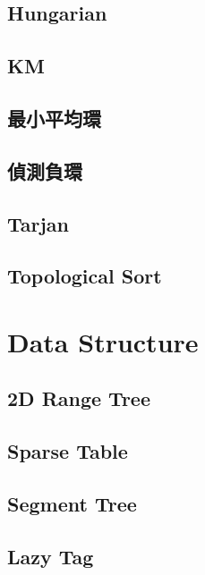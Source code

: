 \subsection{Hungarian}

\subsection{KM}

\subsection{最小平均環}

\subsection{偵測負環}

\subsection{Tarjan}

\subsection{Topological Sort}


\section{Data Structure}

\subsection{2D Range Tree}

\subsection{Sparse Table}

\subsection{Segment Tree}

\subsection{Lazy Tag}




